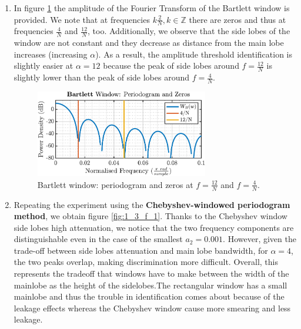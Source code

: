 \begin{enumerate}[label=\alph*), leftmargin=*]
\item

In figure \ref{fig:1_3_e} the amplitude of the Fourier Transform of the Bartlett window is provided. We note that at frequencies $k\frac{2}{N}, k \in \mathbb{Z}$ there are zeros and thus 
at frequencies $\frac{4}{N}$ and $\frac{12}{N}$, too. Additionally, we observe that the side lobes of the window are not constant and they decrease as distance from the main lobe increases (increasing $\alpha$).
As a result, the amplitude threshold identification is slightly easier at $\alpha = 12$ because the peak of side lobes around $f = \frac{12}{N}$ is slightly lower than the peak of side lobes around $f = \frac{4}{N}$.

\begin{figure}[h]
    \centering
    \includegraphics[height=1.5in]{report/spectrum-estimation/resolution-and-leakage-of-periodogram-based-methods/assets/e/bartlett-zeros-alpha}
    \caption{Bartlett window: periodogram and zeros at $f = \frac{12}{N}$ and $f = \frac{4}{N}$.}
    \label{fig:1_3_e}
\end{figure}

\item

Repeating the experiment using the \textbf{Chebyshev-windowed periodogram method}, we obtain figure \ref{fig:1_3_f_1}. Thanks to the Chebyshev window side lobes high attenuation,
we notice that the two frequency components are distinguishable even in the case of the smallest $a_{2} = 0.001$. However, given the trade-off between side lobes attenuation
and main lobe bandwidth, for $\alpha = 4$, the two peaks overlap, making discrimination more difficult. Overall, this represents the tradeoff that windows have to make between
the width of the mainlobe as the height of the sidelobes.The rectangular window has a small mainlobe and thus the trouble in identification comes about because of the leakage effects
whereas the Chebyshev window cause more smearing and less leakage.


\end{enumerate}
